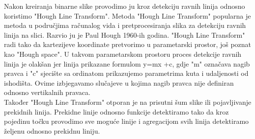 \documentclass[times, utf8, zavrsni, numeric]{fer}
\begin{document}
Nakon kreiranja binarne slike provodimo ju kroz detekciju ravnih linija odnosno koristimo "Hough Line Transform"\cite{hough}. Metoda "Hough Line Transform" popularna je metoda u područjima računalog vida i pretprocesiranja slika za detekciju ravnih linija na slici. Razvio ju je Paul Hough 1960-ih godina. "Hough Line Transform" radi tako da kartezijeve koordinate pretvorimo u parametarski prostor, još poznat kao "Hough space". U takvom parametarskom prostoru proces detekcije ravnih linija je olakšan jer linija prikazane formulom y=mx +c, gdje "m" označava nagib pravca i "c" sjecište sa ordinatom prikazujemo parametrima kuta i udaljenosti od ishodišta. Ovime izbjegavamo slučajeve u kojima nagib pravca nije definiran odnosno vertikalnih pravaca.
\\
Također "Hough Line Transform" otporan je na prisutni šum slike ili pojavljivanje prekidnih linija. Prekidne linije odnosno funkcije detektiramo tako da kroz pojedinu točku provodimo sve moguće linije i agregacijom svih linija detektiramo željenu odnosno prekidnu liniju.
\end{document}
